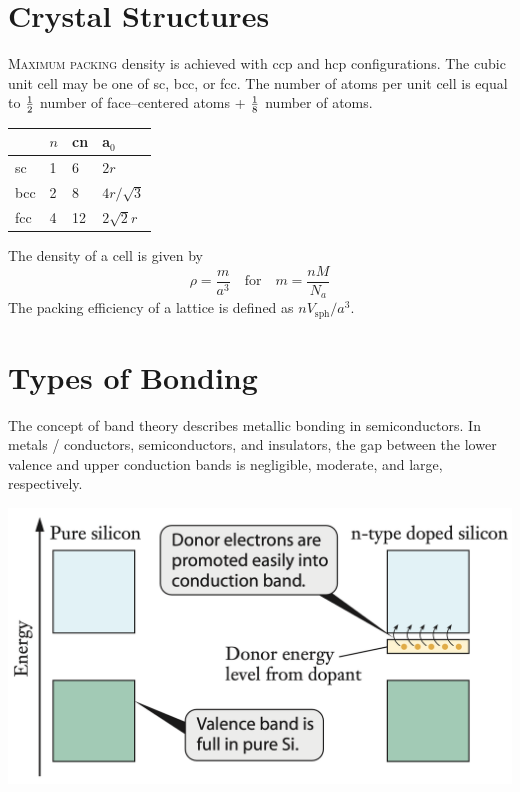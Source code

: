 \documentclass{tufte-book}
\begin{document}
\section{Crystal Structures}
\textsc{Maximum packing} density is achieved with ccp and hcp configurations. The cubic unit cell may be one of sc, bcc, or fcc. The number of atoms per unit cell is equal to $1 \over 2$ number of face--centered atoms + $1 \over 8$ number of atoms.
\begin{center}
  \begin{tabular}{llll}
    & $n$ & cn & a$_0$ \\
    \hline
    sc & 1 & 6 & $2r$ \\
    bcc & 2 & 8 & $4r / \sqrt 3$ \\
    fcc & 4 & 12 & $2 \sqrt 2r$
  \end{tabular} \phantom{mm}
\end{center}
The density of a cell is given by \begin{equation}
  \rho = \frac{m}{a^3} \quad\text{for}\quad m = \frac{nM}{N_a}
\end{equation}
The packing efficiency of a lattice is defined as $n V_{\text{sph}} / a^3$.

\section{Types of Bonding}
The concept of band theory describes metallic bonding in semiconductors. In metals / conductors, semiconductors, and insulators, the gap between the lower valence and upper conduction bands is negligible, moderate, and large, respectively.

\begin{marginfigure}
\begin{center}
  \includegraphics[width=\textwidth]{ntype} \phantom{mmm}
\end{center}
\end{marginfigure}
\end{document}
